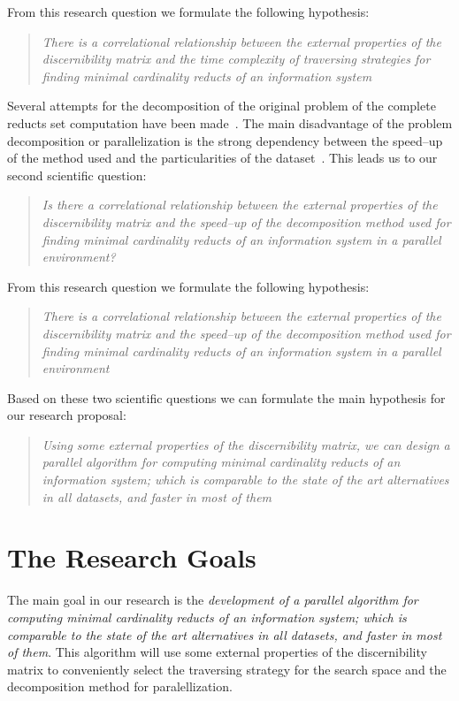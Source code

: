 \documentclass[11pt]{article}   %
\begin{document}
  From this research question we formulate the following hypothesis:
  
\begin{quote}  
  \emph{There is a correlational relationship between the external properties of the discernibility matrix and the time 
  		complexity of traversing strategies for finding minimal cardinality reducts of an information
  		system}
\end{quote}
  		
  Several attempts for the decomposition of the original problem of the complete reducts set computation have 
  been made~\cite{Strakowski08,Jiao10,Kopczynski14}. The main disadvantage of the problem decomposition or
  parallelization is the strong dependency between the speed--up of the method used and the particularities of 
  the dataset~\cite{Strakowski08}. This leads us to our second scientific question:
  
\begin{quote}
  \emph{Is there a correlational relationship between the external properties of the discernibility matrix and the 
  		speed--up of the decomposition method used for finding minimal cardinality reducts of an information
  		system in a parallel environment?}
\end{quote}

  From this research question we formulate the following hypothesis:
    
\begin{quote}
  \emph{There is a correlational relationship between the external properties of the discernibility matrix and the 
  		speed--up of the decomposition method used for finding minimal cardinality reducts of an information
  		system in a parallel environment}
\end{quote}

  Based on these two scientific questions we can formulate the main hypothesis for our research proposal:
  
\begin{quote}
  \emph{Using some external properties of the discernibility matrix, we can design a parallel algorithm 
  		for computing minimal cardinality reducts of an information system; which is comparable to the 
  		state of the art alternatives in all datasets, and faster in most of them}
\end{quote}  

\section{The Research Goals}\label{Goals} 
  The main goal in our research is the \emph{development of  a parallel algorithm for computing minimal
  cardinality reducts of an information system; which is comparable to the state of the art alternatives 
  in all datasets, and faster in most of them}. This algorithm will use some external properties of the
  discernibility matrix to conveniently select the traversing strategy for the search space and the 
  decomposition method for paralellization.
  
\end{document}
